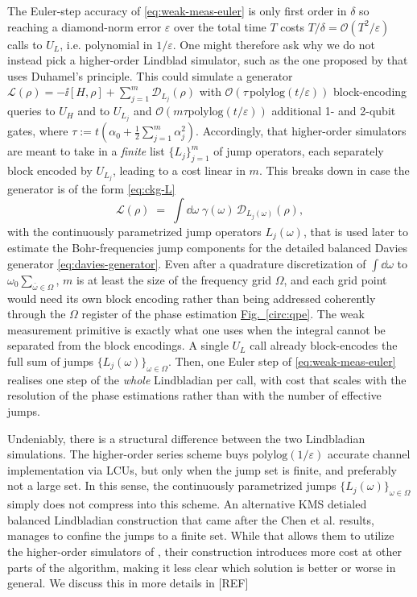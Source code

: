 The Euler-step accuracy of \eqref{eq:weak-meas-euler} is only first order in $\delta$ so reaching a diamond-norm error $\varepsilon$ over the total time $T$ costs $T/\delta = \mathcal{O}(T^2 / \varepsilon)$ calls to $U_L$, i.e. polynomial in $1 / \varepsilon$. One might therefore ask why we do not instead pick a higher-order Lindblad simulator, such as the one proposed by \cite{li2022simulating} that uses Duhamel's principle. This could simulate a generator $\mathcal{L}(\rho) = -\ii[H,\rho] + \sum_{j=1}^m \mathcal{D}_{L_j}(\rho)$ with $\mathcal{O}(\tau\,\mathrm{polylog}(t/\varepsilon))$ block-encoding queries to $U_H$ and to $U_{L_j}$ and $\mathcal{O}(m\tau \mathrm{polylog}(t / \varepsilon))$ additional 1- and 2-qubit gates, where $\tau := t (\alpha_0 + \tfrac{1}{2}\sum_{j=1}^m \alpha_j^2)$. Accordingly, that higher-order simulators are meant to take in a \emph{finite} list $\{L_j\}_{j=1}^m$ of jump operators, each separately block encoded by $U_{L_j}$, leading to a cost linear in $m$. This breaks down in case the generator is of the form \eqref{eq:ckg-L}
$$
\mathcal{L}(\rho) \;=\;\int \dd\omega\;\gamma(\omega)\,\mathcal{D}_{L_j(\omega)}(\rho),
$$
with the continuously parametrized jump operators $L_j(\omega)$, that is used later to estimate the Bohr-frequencies jump components for the detailed balanced Davies generator \eqref{eq:davies-generator}. Even after a quadrature discretization of $\int \dd \omega$ to $\omega_0\sum_{\bar{\omega} \in \Omega}$, $m$ is at least the size of the frequency grid $\Omega$, and each grid point would need its own block encoding rather than being addressed coherently through the $\Omega$ register of the phase estimation \hyperref[circ:qpe]{Fig.~\ref*{circ:qpe}}. The weak measurement primitive is exactly what one uses when the integral cannot be separated from the block encodings. A single $U_L$ call already block-encodes the full sum of jumps $\{L_j(\omega)\}_{\omega\in\Omega}$. Then, one Euler step of \eqref{eq:weak-meas-euler} realises one step of the \emph{whole} Lindbladian per call, with cost that scales with the resolution of the phase estimations rather than with the number of effective jumps.

Undeniably, there is a structural difference between the two Lindbladian simulations. The higher-order series scheme buys $\mathrm{polylog}(1/\varepsilon)$ accurate channel implementation via LCUs, but only when the jump set is finite, and preferably not a large set. In this sense, the continuously parametrized jumps $\{L_j(\omega)\}_{\omega\in\Omega}$ simply does not compress into this scheme. An alternative KMS detialed balanced Lindbladian construction \cite{ding2025efficient} that came after the Chen et al. results, manages to confine the jumps to a finite set. While that allows them to utilize the higher-order simulators of \cite{li2022simulating}, their construction introduces more cost at other parts of the algorithm, making it less clear which solution is better or worse in general. We discuss this in more details in [REF] 

